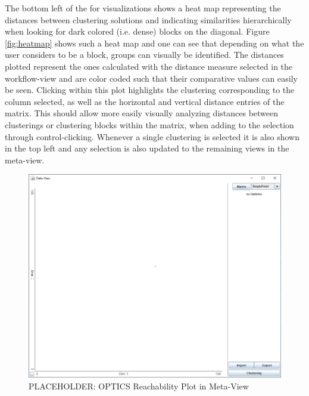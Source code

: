 \documentclass[
	a4paper,
	english,
	twoside,
	openright,               
	11pt                            
	]{report}
\begin{document}
The bottom left of the for visualizations shows a heat map representing the distances between clustering solutions and indicating similarities hierarchically when looking for dark colored (i.e. dense) blocks on the diagonal. Figure \ref{fig:heatmap} shows such a heat map and one can see that depending on what the user considers to be a block, groups can visually be identified. The distances plotted represent the ones calculated with the distance measure selected in the workflow-view and are color coded such that their comparative values can easily be seen. Clicking within this plot highlights the clustering corresponding to the column selected, as well as the horizontal and vertical distance entries of the matrix. This should allow more easily visually analyzing distances between clusterings or clustering blocks within the matrix, when adding to the selection through control-clicking. Whenever a single clustering is selected it is also shown in the top left and any selection is also updated to the remaining views in the meta-view.

\begin{figure}[h]
	\centering
	\includegraphics[scale=.45]{data-view}
	\caption{PLACEHOLDER: OPTICS Reachability Plot in Meta-View }
	\label{fig:opticsplot}
\end{figure}
\end{document}
